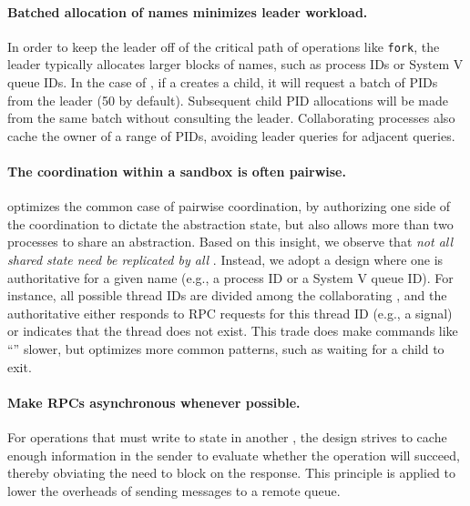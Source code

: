 \paragraph{Batched allocation of names minimizes leader workload.}
In order to keep the leader off of the critical path of operations like {\tt fork}, 
the leader typically allocates larger blocks of names, such as process IDs or System V queue IDs.
In the case of , if a \picoproc{} creates a child, it will request a batch of 
PIDs from the leader (50 by default).  Subsequent child PID allocations will be made from the same 
batch without consulting the leader.
Collaborating processes also cache the owner of a range of PIDs, avoiding 
leader queries for adjacent queries.

\paragraph{The coordination within a sandbox is often pairwise.}
\graphene{} optimizes the common case of pairwise coordination,
by authorizing one side of the coordination to dictate the abstraction state,
but also allows
more than two processes to share an abstraction.
Based on this insight, 
we observe that {\em not all shared state need be replicated by all \picoprocs{}}.
Instead, we adopt a design where one \picoproc{} is authoritative for a given name (e.g., a process ID or a System V queue ID).
For instance, all possible thread IDs are divided among the collaborating \picoprocs{},
and the authoritative \picoproc{} either responds to RPC requests for this thread ID (e.g., a signal)
or indicates that the thread does not exist.
This trade does make commands like ``'' slower, 
but optimizes more common patterns, such as waiting for a child to exit.

\paragraph{Make RPCs asynchronous whenever possible.} 
For operations that must write to state in another \picoproc{}, 
the \graphene{} design strives to cache enough information in the sender 
to evaluate whether the operation will succeed, thereby obviating the 
need to block on the response.  This principle is applied to lower the overheads
of sending messages to a remote queue.





